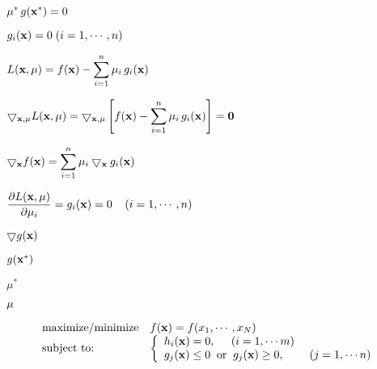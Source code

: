\documentclass{article}
\def\lthtmlcheckvsize{\ifdim\ht\sizebox<\vsize 
  \ifdim\wd\sizebox<\hsize\expandafter\hfill\fi \expandafter\vfill
  \else\expandafter\vss\fi}%
\begin{document}
{\newpage\clearpage
{}%
$\displaystyle \mu^*\,g({\bf x}^*)=0$%
\lthtmlindisplaymathZ
\lthtmlcheckvsize\clearpage}

{\newpage\clearpage
{}%
$ g_i({\bf x})=0\;(i=1,\cdots,n)$%
\lthtmlindisplaymathZ
\lthtmlcheckvsize\clearpage}

{\newpage\clearpage
{}%
$\displaystyle L({\bf x},{\bf\mu})=f({\bf x})-\sum_{i=1}^n\mu_i\,g_i({\bf x})$%
\lthtmlindisplaymathZ
\lthtmlcheckvsize\clearpage}

{\newpage\clearpage
{}%
$\displaystyle \bigtriangledown_{{\bf x},{\bf\mu}} L({\bf x},{\bf\mu})
=\bigtriangledown_{{\bf x},{\bf\mu}}\left[f({\bf x})-\sum_{i=1}^n\mu_i\,g_i({\bf x})\right]
={\bf0}$%
\lthtmlindisplaymathZ
\lthtmlcheckvsize\clearpage}

{\newpage\clearpage
{}%
$\displaystyle \bigtriangledown_{\bf x}f({\bf x})
=\sum_{i=1}^n\mu_i \bigtriangledown_{\bf x} g_i({\bf x})$%
\lthtmlindisplaymathZ
\lthtmlcheckvsize\clearpage}

{\newpage\clearpage
{}%
$\displaystyle \frac{\partial L({\bf x},{\bf\mu})}{\partial\mu_i}
=g_i({\bf x})=0\;\;\;\;(i=1,\cdots,n)$%
\lthtmlindisplaymathZ
\lthtmlcheckvsize\clearpage}

{\newpage\clearpage
{}%
$ \bigtriangledown g({\bf x})$%
\lthtmlindisplaymathZ
\lthtmlcheckvsize\clearpage}

{\newpage\clearpage
{}%
$ g({\bf x}^*)$%
\lthtmlindisplaymathZ
\lthtmlcheckvsize\clearpage}

{\newpage\clearpage
{}%
$ \mu^*$%
\lthtmlindisplaymathZ
\lthtmlcheckvsize\clearpage}

{\newpage\clearpage
{}%
$ {\bf\mu}$%
\lthtmlindisplaymathZ
\lthtmlcheckvsize\clearpage}

{\newpage\clearpage
{}%
\begin{displaymath}\begin{array}{ll}
\mbox{maximize/minimize} & f({\bf x})=f(x_1,\cdots,x_N) \\
\mbox{subject to:} &
\left\{ \begin{array}{l}
h_i({\bf x})=0,\;\;\;\;\;(i=1,\cdots m)\\
g_j({\bf x})\le 0\;\;\mbox{or}\;\;
g_j({\bf x})\ge 0,\;\;\;\;\;\;\;\;(j=1,\cdots n)\\
\end{array} \right.
\end{array}\end{displaymath}%
\lthtmldisplayZ
\lthtmlcheckvsize\clearpage}
\end{document}
